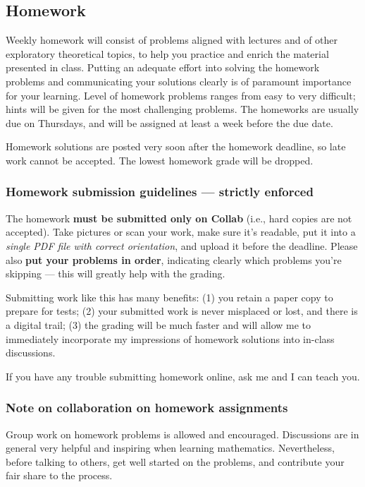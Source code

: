 \documentclass[oneside,11pt]{amsart}
\begin{document}
\subsection{Homework}

Weekly homework will consist of 
problems aligned with lectures
and of other exploratory theoretical topics,
to help you practice and enrich the material presented in class.
Putting an adequate effort into solving the homework
problems and 
communicating your solutions clearly is 
of paramount importance for your learning. 
Level of homework problems ranges from easy to very difficult;
hints will be given for the most challenging problems.
The homeworks are usually due on
Thursdays, and will be assigned at least a week before the due
date. 

Homework solutions are posted very soon after the 
homework deadline, so late work cannot be accepted.
The lowest homework grade will be dropped.

\subsubsection*{Homework submission guidelines --- strictly enforced}
The homework \textbf{must be submitted only on Collab} (i.e., hard copies are not accepted). 
Take pictures or scan your work,
make sure it's readable,
put it into a \emph{single PDF file with correct orientation},
and upload it before the deadline.
Please also \textbf{put your problems in order}, indicating clearly which problems you're skipping --- this will greatly help with the grading.

Submitting work like this has many benefits:
(1) you retain a paper copy to
prepare for tests; 
(2) your submitted work is never misplaced or lost, and there is a digital trail;
(3) the grading will be much faster and will allow me to immediately
incorporate my impressions of homework solutions into in-class
discussions. 

If you have any trouble submitting homework online, ask me and I can teach you.

\subsubsection*{Note on collaboration on homework assignments}
\label{collaboration}

Group work on homework problems is allowed and encouraged.
Discussions are in general very
helpful and inspiring when learning mathematics. 
Nevertheless, before talking to others, get well started
on the problems, and contribute your fair share to the process. 
\end{document}
